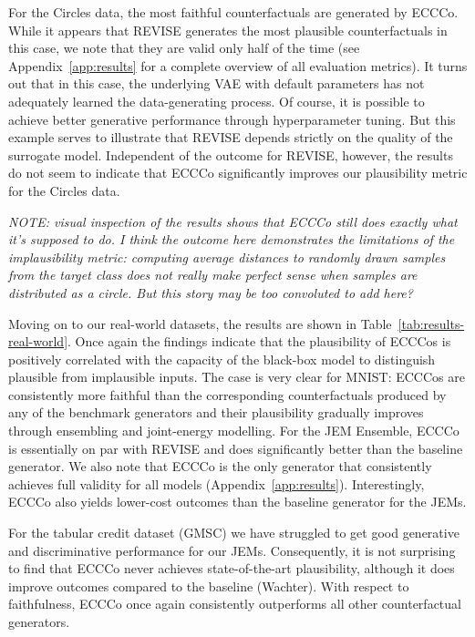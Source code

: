 \documentclass{article}
\begin{document}
For the Circles data, the most faithful counterfactuals are generated by ECCCo. While it appears that REVISE generates the most plausible counterfactuals in this case, we note that they are valid only half of the time (see Appendix~\ref{app:results} for a complete overview of all evaluation metrics). It turns out that in this case, the underlying VAE with default parameters has not adequately learned the data-generating process. Of course, it is possible to achieve better generative performance through hyperparameter tuning. But this example serves to illustrate that REVISE depends strictly on the quality of the surrogate model. Independent of the outcome for REVISE, however, the results do not seem to indicate that ECCCo significantly improves our plausibility metric for the Circles data. 

\textit{NOTE: visual inspection of the results shows that ECCCo still does exactly what it's supposed to do. I think the outcome here demonstrates the limitations of the implausibility metric: computing average distances to randomly drawn samples from the target class does not really make perfect sense when samples are distributed as a circle. But this story may be too convoluted to add here?}

Moving on to our real-world datasets, the results are shown in Table~\ref{tab:results-real-world}. Once again the findings indicate that the plausibility of ECCCos is positively correlated with the capacity of the black-box model to distinguish plausible from implausible inputs. The case is very clear for MNIST: ECCCos are consistently more faithful than the corresponding counterfactuals produced by any of the benchmark generators and their plausibility gradually improves through ensembling and joint-energy modelling. For the JEM Ensemble, ECCCo is essentially on par with REVISE and does significantly better than the baseline generator. We also note that ECCCo is the only generator that consistently achieves full validity for all models (Appendix~\ref{app:results}). Interestingly, ECCCo also yields lower-cost outcomes than the baseline generator for the JEMs. 

For the tabular credit dataset (GMSC) we have struggled to get good generative and discriminative performance for our JEMs. Consequently, it is not surprising to find that ECCCo never achieves state-of-the-art plausibility, although it does improve outcomes compared to the baseline (Wachter). With respect to faithfulness, ECCCo once again consistently outperforms all other counterfactual generators.
\end{document}
